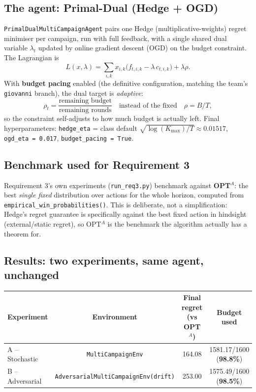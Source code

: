 \documentclass[11pt,a4paper]{article}
\newcommand{\1}{\mathbf{1}}
\begin{document}
\subsection{The agent: Primal-Dual (Hedge + OGD)}

\texttt{PrimalDualMultiCampaignAgent} pairs one Hedge (multiplicative-weights) regret minimiser per campaign, run with full feedback, with a single shared dual variable $\lambda_t$ updated by online gradient descent (OGD) on the budget constraint. The Lagrangian is
\[
  L(x,\lambda) = \sum_{i,k} x_{i,k}\big(f_{t,i,k} - \lambda\, c_{t,i,k}\big) + \lambda \rho .
\]
With \textbf{budget pacing} enabled (the definitive configuration, matching the team's \texttt{giovanni} branch), the dual target is \emph{adaptive}:
\[
  \rho_t = \frac{\text{remaining budget}}{\text{remaining rounds}} \quad\text{instead of the fixed}\quad \rho = B/T,
\]
so the constraint self-adjusts to how much budget is actually left. Final hyperparameters: \texttt{hedge\_eta} = class default $\sqrt{\log(K_{\max})/T} \approx 0.01517$, \texttt{ogd\_eta = 0.017}, \texttt{budget\_pacing = True}.

\subsection{Benchmark used for Requirement 3}

Requirement 3's own experiments (\texttt{run\_req3.py}) benchmark against \textbf{OPT$^A$}: the best \emph{single fixed} distribution over actions for the whole horizon, computed from \texttt{empirical\_win\_probabilities()}. This is deliberate, not a simplification: Hedge's regret guarantee is specifically against the best fixed action in hindsight (external/static regret), so OPT$^A$ is the benchmark the algorithm actually has a theorem for.

\subsection{Results: two experiments, same agent, unchanged}

\begin{center}
\begin{tabular}{@{}lccc@{}}
\toprule
Experiment & Environment & Final regret (vs OPT$^A$) & Budget used \\
\midrule
A -- Stochastic & \texttt{MultiCampaignEnv} & 164.08 & 1581.17/1600 (\textbf{98.8\%}) \\
B -- Adversarial & \texttt{AdversarialMultiCampaignEnv(drift)} & 253.00 & 1575.49/1600 (\textbf{98.5\%}) \\
\bottomrule
\end{tabular}
\end{center}
\end{document}
